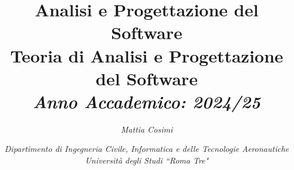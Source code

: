 \documentclass{article}
\numberwithin{equation}{subsection}
\begin{document}
\title{%
    \textbf{Analisi e Progettazione del Software}  \\ 
    \large Teoria di Analisi e Progettazione del Software\\
    \textit{Anno Accademico: 2024/25}}
\author{\textit{Mattia Cosimi}}
\date{\textit{Dipartimento di Ingegneria Civile, Informatica e delle Tecnologie Aeronautiche \\
Università degli Studi ``Roma Tre"}}

\maketitle


\clearpage

\pagestyle{fancy}
\fancyhead{}\fancyfoot{}
\fancyfoot[C]{\thepage}

\tableofcontents

\clearpage

\end{document}
